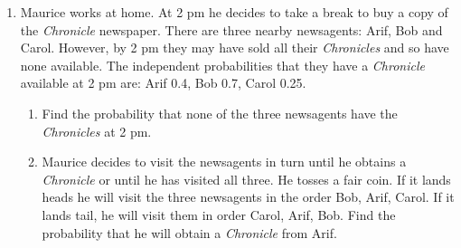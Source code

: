 \documentclass[12pt]{scrartcl}
\begin{document}
\begin{enumerate}[label=\textbf{\arabic*.}]
\begin{enumerate}[label=(\alph*)]
\item \textbf{Median.}
Compute cumulative frequencies:
\[
12,\ 66,\ 134,\ 175,\ 198.
\]
Since $n=198$, the median position is $n/2=99$, which lies in the class $55$ to $65$.

Let $L=55$ be the lower class boundary, $w=10$ the class width, $c_f=66$ the cumulative frequency before the median class, and $f_m=68$ the frequency of the median class. Then
\begin{align*}
\text{Median}
&= L+\left(\frac{\frac{n}{2}-c_f}{f_m}\right)w\\
&=55+\left(\frac{99-66}{68}\right)10\\
&=55+\frac{33}{68}\cdot 10\\
&\approx 59.85\text{ minutes.}
\end{align*}

\item \textbf{Mode.}
The modal class is $55$ to $65$ (highest frequency $f_1=68$). Let $L=55$, $w=10$, $f_0=54$ (frequency of the class before), and $f_2=41$ (frequency of the class after). Using the grouped-data mode formula,
\begin{align*}
\text{Mode}
&=L+\left(\frac{f_1-f_0}{2f_1-f_0-f_2}\right)w\\
&=55+\left(\frac{68-54}{2(68)-54-41}\right)10\\
&=55+\left(\frac{14}{41}\right)10\\
&\approx 58.41\text{ minutes.}
\end{align*}
\end{enumerate}

\newpage
\item Maurice works at home. At 2 pm he decides to take a break to buy a copy of the \emph{Chronicle} newspaper.
There are three nearby newsagents: Arif, Bob and Carol. However, by 2 pm they may have sold all their \emph{Chronicles} and so have none available.
The independent probabilities that they have a \emph{Chronicle} available at 2 pm are: Arif 0.4, Bob 0.7, Carol 0.25.

\begin{enumerate}[label=(\alph*)]
\item Find the probability that none of the three newsagents have the \emph{Chronicles} at 2 pm.
\item Maurice decides to visit the newsagents in turn until he obtains a \emph{Chronicle} or until he has visited all three.
He tosses a fair coin. If it lands heads he will visit the three newsagents in the order Bob, Arif, Carol.
If it lands tail, he will visit them in order Carol, Arif, Bob.
Find the probability that he will obtain a \emph{Chronicle} from Arif.
\end{enumerate}


\end{enumerate}
\end{document}
